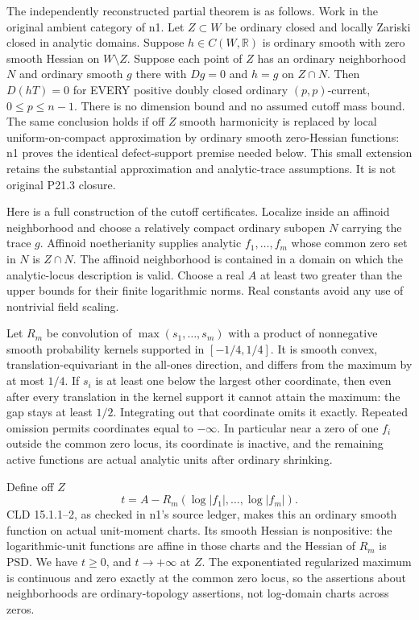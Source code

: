 \documentclass[11pt]{article}
\begin{document}
The independently reconstructed partial theorem is as follows. Work in the original ambient category of n1. Let \(Z\subset W\) be ordinary closed and locally Zariski closed in analytic domains. Suppose \(h\in C(W,\mathbb R)\) is ordinary smooth with zero smooth Hessian on \(W\setminus Z\). Suppose each point of \(Z\) has an ordinary neighborhood \(N\) and ordinary smooth \(g\) there with \(Dg=0\) and \(h=g\) on \(Z\cap N\). Then \(D(hT)=0\) for EVERY positive doubly closed ordinary \((p,p)\)-current, \(0\leq p\leq n-1\). There is no dimension bound and no assumed cutoff mass bound. The same conclusion holds if off \(Z\) smooth harmonicity is replaced by local uniform-on-compact approximation by ordinary smooth zero-Hessian functions: n1 proves the identical defect-support premise needed below. This small extension retains the substantial approximation and analytic-trace assumptions. It is not original P21.3 closure.

Here is a full construction of the cutoff certificates. Localize inside an affinoid neighborhood and choose a relatively compact ordinary subopen \(N\) carrying the trace \(g\). Affinoid noetherianity supplies analytic \(f_1,\ldots,f_m\) whose common zero set in \(N\) is \(Z\cap N\). The affinoid neighborhood is contained in a domain on which the analytic-locus description is valid. Choose a real \(A\) at least two greater than the upper bounds for their finite logarithmic norms. Real constants avoid any use of nontrivial field scaling.

Let \(R_m\) be convolution of \(\max(s_1,\ldots,s_m)\) with a product of nonnegative smooth probability kernels supported in \([-1/4,1/4]\). It is smooth convex, translation-equivariant in the all-ones direction, and differs from the maximum by at most \(1/4\). If \(s_i\) is at least one below the largest other coordinate, then even after every translation in the kernel support it cannot attain the maximum: the gap stays at least \(1/2\). Integrating out that coordinate omits it exactly. Repeated omission permits coordinates equal to \(-\infty\). In particular near a zero of one \(f_i\) outside the common zero locus, its coordinate is inactive, and the remaining active functions are actual analytic units after ordinary shrinking.

Define off \(Z\)
\[
 t=A-R_m(\log|f_1|,\ldots,\log|f_m|).
\]
CLD 15.1.1--2, as checked in n1's source ledger, makes this an ordinary smooth function on actual unit-moment charts. Its smooth Hessian is nonpositive: the logarithmic-unit functions are affine in those charts and the Hessian of \(R_m\) is PSD. We have \(t\geq0\), and \(t\to+\infty\) at \(Z\). The exponentiated regularized maximum is continuous and zero exactly at the common zero locus, so the assertions about neighborhoods are ordinary-topology assertions, not log-domain charts across zeros.
\end{document}
